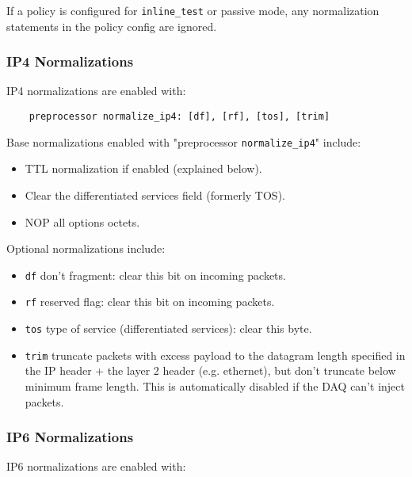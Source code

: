 \documentclass[english]{report}
\begin{document}
If a policy is configured for \texttt{inline\_test} or passive mode, any
normalization statements in the policy config are ignored.

\subsubsection{IP4 Normalizations}

IP4 normalizations are enabled with:

\begin{verbatim}
    preprocessor normalize_ip4: [df], [rf], [tos], [trim]
\end{verbatim}

Base normalizations enabled with "preprocessor \texttt{normalize\_ip4}" include:

\begin{itemize} 
\item
TTL normalization if enabled (explained below).

\item
Clear the differentiated services field (formerly TOS).

\item
NOP all options octets.
\end{itemize} 

Optional normalizations include:

\begin{itemize} 
\item \texttt{df} 
don't fragment:  clear this bit on incoming packets.

\item \texttt{rf} 
reserved flag:  clear this bit on incoming packets.

\item \texttt{tos} 
type of service (differentiated services): clear this byte.

\item \texttt{trim} 
truncate packets with excess payload to the datagram length specified in the
IP header + the layer 2 header (e.g. ethernet), but don't truncate below minimum
frame length.  This is automatically disabled if the DAQ can't inject packets.
\end{itemize} 

\subsubsection{IP6 Normalizations}

IP6 normalizations are enabled with:
\end{document}
